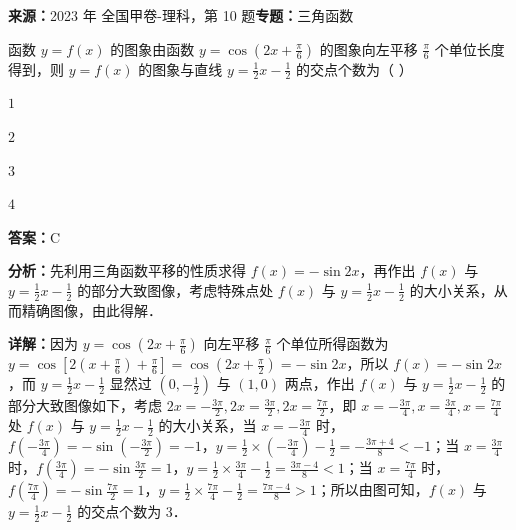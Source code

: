 \begin{question}[points=5]
\textbf{来源：}2023 年 全国甲卷-理科，第 10 题\quad \textbf{专题：}三角函数\par
函数 $y = f(x)$ 的图象由函数 $y = \cos\left(2x + \frac{\pi}{6}\right)$ 的图象向左平移 $\frac{\pi}{6}$ 个单位长度得到，则 $y = f(x)$ 的图象与直线 $y = \frac{1}{2}x - \frac{1}{2}$ 的交点个数为（                  ）
\begin{choices}
  \item $1$
  \item $2$
  \item $3$
  \item $4$
\end{choices}
\begin{solution}
\textbf{答案：}C

\textbf{分析：}先利用三角函数平移的性质求得 $f(x) = -\sin 2x$，再作出 $f(x)$ 与 $y = \frac{1}{2}x - \frac{1}{2}$ 的部分大致图像，考虑特殊点处 $f(x)$ 与 $y = \frac{1}{2}x - \frac{1}{2}$ 的大小关系，从而精确图像，由此得解．

\textbf{详解：}因为 $y = \cos\left(2x + \frac{\pi}{6}\right)$ 向左平移 $\frac{\pi}{6}$ 个单位所得函数为 $y = \cos\left[2\left(x + \frac{\pi}{6}\right) + \frac{\pi}{6}\right] = \cos\left(2x + \frac{\pi}{2}\right) = -\sin 2x$，所以 $f(x) = -\sin 2x$，而 $y = \frac{1}{2}x - \frac{1}{2}$ 显然过 $(0, -\frac{1}{2})$ 与 $(1,0)$ 两点，作出 $f(x)$ 与 $y = \frac{1}{2}x - \frac{1}{2}$ 的部分大致图像如下，考虑 $2x = -\frac{3\pi}{2}, 2x = \frac{3\pi}{2}, 2x = \frac{7\pi}{2}$，即 $x = -\frac{3\pi}{4}, x = \frac{3\pi}{4}, x = \frac{7\pi}{4}$ 处 $f(x)$ 与 $y = \frac{1}{2}x - \frac{1}{2}$ 的大小关系，当 $x = -\frac{3\pi}{4}$ 时，$f(-\frac{3\pi}{4}) = -\sin\left(-\frac{3\pi}{2}\right) = -1$，$y = \frac{1}{2}\times\left(-\frac{3\pi}{4}\right) - \frac{1}{2} = -\frac{3\pi+4}{8} < -1$；当 $x = \frac{3\pi}{4}$ 时，$f(\frac{3\pi}{4}) = -\sin\frac{3\pi}{2} = 1$，$y = \frac{1}{2}\times\frac{3\pi}{4} - \frac{1}{2} = \frac{3\pi-4}{8} < 1$；当 $x = \frac{7\pi}{4}$ 时，$f(\frac{7\pi}{4}) = -\sin\frac{7\pi}{2} = 1$，$y = \frac{1}{2}\times\frac{7\pi}{4} - \frac{1}{2} = \frac{7\pi-4}{8} > 1$；所以由图可知，$f(x)$ 与 $y = \frac{1}{2}x - \frac{1}{2}$ 的交点个数为 3．
\end{solution}
\end{question}

